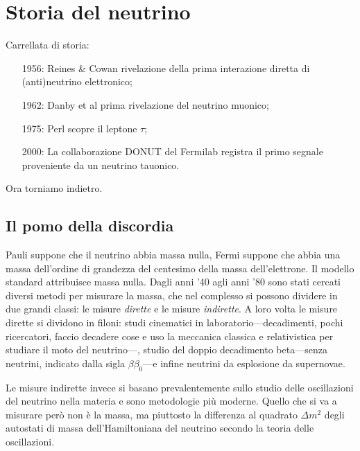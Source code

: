 \section{Storia del neutrino}
        Carrellata di storia:
        \begin{enumerate}
            \item[1956:] Reines \& Cowan rivelazione della prima interazione diretta di (anti)neutrino elettronico;
            \item[1962:] Danby et al prima rivelazione del neutrino muonico;
            \item[1975:] Perl scopre il leptone $\tau$;
            \item[2000:] La collaborazione DONUT del Fermilab registra il primo segnale proveniente da un neutrino tauonico.
        \end{enumerate}
        Ora torniamo indietro.
        \subsection{Il pomo della discordia}
            Pauli suppone che il neutrino abbia massa nulla, Fermi suppone che abbia una massa dell'ordine di grandezza del centesimo della massa dell'elettrone. Il modello standard attribuisce massa nulla. Dagli anni '40 agli anni '80 sono stati cercati diversi metodi per misurare la massa, che nel complesso si possono dividere in due grandi classi: le misure \emph{dirette} e le misure \emph{indirette}. A loro volta le misure dirette si dividono in filoni: studi cinematici in laboratorio---decadimenti, pochi ricercatori, faccio decadere cose e uso la meccanica classica e relativistica per studiare il moto del neutrino---, studio del doppio decadimento beta---senza neutrini, indicato dalla sigla $\beta\beta_0$---e infine neutrini da esplosione da supernovae.

            Le misure indirette invece si basano prevalentemente sullo studio delle oscillazioni del neutrino nella materia e sono metodologie più moderne. Quello che si va a misurare però non è la massa, ma piuttosto la differenza al quadrato $\Delta m^2$ degli autostati di massa dell'Hamiltoniana del neutrino secondo la teoria delle oscillazioni.

